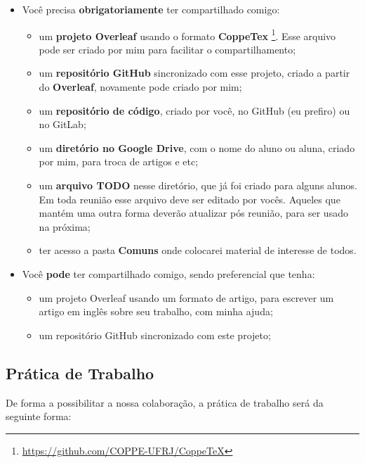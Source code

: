 \documentclass{article}
\begin{document}
\begin{itemize}
    \item Você precisa \textbf{obrigatoriamente} ter compartilhado comigo:
    \begin{itemize}
        \item um \textbf{projeto Overleaf} usando o formato \textbf{CoppeTex} \footnote{\url{https://github.com/COPPE-UFRJ/CoppeTeX}}. Esse arquivo pode ser criado por mim para facilitar o compartilhamento;
        \item um \textbf{repositório GitHub} sincronizado com esse projeto, criado a partir do \textbf{Overleaf}, novamente pode criado por mim;
        \item um \textbf{repositório de código}, criado por você, no GitHub (eu prefiro) ou no GitLab;
        \item um \textbf{diretório no Google Drive}, com o nome do aluno ou aluna, criado por mim, para troca de artigos e etc;
        \item um \textbf{arquivo TODO} nesse diretório, que já foi criado para alguns alunos. Em toda reunião esse arquivo deve ser editado por vocês. Aqueles que mantém uma outra forma deverão atualizar pós reunião, para ser usado na próxima;
        \item ter acesso a pasta \textbf{Comuns} onde colocarei material de interesse de todos.
    \end{itemize}
    \item Você \textbf{pode} ter compartilhado comigo, sendo preferencial que tenha:
    \begin{itemize}
        \item um projeto Overleaf usando um formato de artigo, para escrever um artigo em inglês sobre seu trabalho, com minha ajuda;
        \item um repositório GitHub sincronizado com este projeto;
    \end{itemize}
\end{itemize}


\subsection{Prática de Trabalho}

De forma a possibilitar a nossa colaboração, a prática de trabalho será da seguinte forma:
\end{document}
